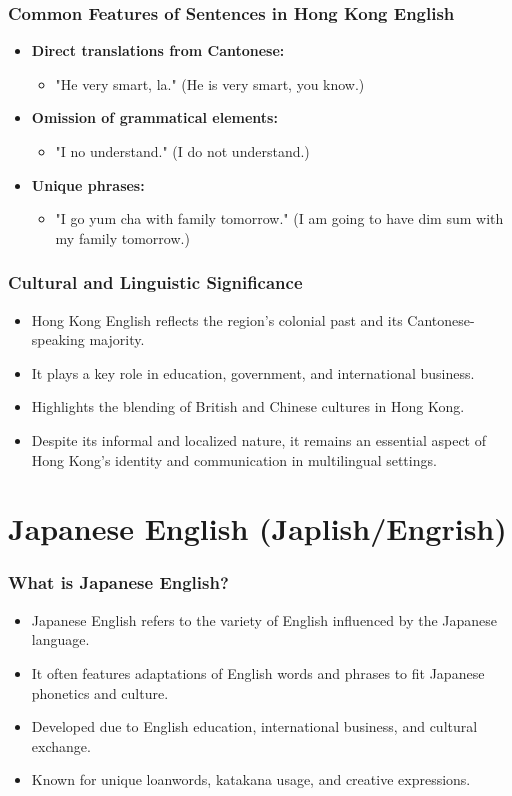 \documentclass{beamer}
\begin{document}
\begin{frame}
\frametitle{Common Features of Sentences in Hong Kong English}
\begin{itemize}
    \item \textbf{Direct translations from Cantonese:}
    \begin{itemize}
        \item "He very smart, la." (He is very smart, you know.)
    \end{itemize}
    \item \textbf{Omission of grammatical elements:}
    \begin{itemize}
        \item "I no understand." (I do not understand.)
    \end{itemize}
    \item \textbf{Unique phrases:}
    \begin{itemize}
        \item "I go yum cha with family tomorrow." (I am going to have dim sum with my family tomorrow.)
    \end{itemize}
\end{itemize}
\end{frame}

\begin{frame}
\frametitle{Cultural and Linguistic Significance}
\begin{itemize}
    \item Hong Kong English reflects the region’s colonial past and its Cantonese-speaking majority.
    \item It plays a key role in education, government, and international business.
    \item Highlights the blending of British and Chinese cultures in Hong Kong.
    \item Despite its informal and localized nature, it remains an essential aspect of Hong Kong’s identity and communication in multilingual settings.
\end{itemize}
\end{frame}


\section{Japanese English (Japlish/Engrish)}



\begin{frame}
\frametitle{What is Japanese English?}
\begin{itemize}
    \item Japanese English refers to the variety of English influenced by the Japanese language.
    \item It often features adaptations of English words and phrases to fit Japanese phonetics and culture.
    \item Developed due to English education, international business, and cultural exchange.
    \item Known for unique loanwords, katakana usage, and creative expressions.
\end{itemize}
\end{frame}
\end{document}
